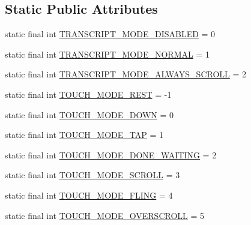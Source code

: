 \subsection*{Static Public Attributes}
\begin{DoxyCompactItemize}
\item 
static final int \hyperlink{classit_1_1sephiroth_1_1android_1_1library_1_1widget_1_1_abs_h_list_view_ae9e9ddb1a1226af35cdcc99a268fb58b}{T\+R\+A\+N\+S\+C\+R\+I\+P\+T\+\_\+\+M\+O\+D\+E\+\_\+\+D\+I\+S\+A\+B\+L\+ED} = 0
\item 
static final int \hyperlink{classit_1_1sephiroth_1_1android_1_1library_1_1widget_1_1_abs_h_list_view_a25b0476067d7722fd323bd283c96cdca}{T\+R\+A\+N\+S\+C\+R\+I\+P\+T\+\_\+\+M\+O\+D\+E\+\_\+\+N\+O\+R\+M\+AL} = 1
\item 
static final int \hyperlink{classit_1_1sephiroth_1_1android_1_1library_1_1widget_1_1_abs_h_list_view_a9cd6c736e279c525b81fa03f783d047c}{T\+R\+A\+N\+S\+C\+R\+I\+P\+T\+\_\+\+M\+O\+D\+E\+\_\+\+A\+L\+W\+A\+Y\+S\+\_\+\+S\+C\+R\+O\+LL} = 2
\item 
static final int \hyperlink{classit_1_1sephiroth_1_1android_1_1library_1_1widget_1_1_abs_h_list_view_a9e07e6f0ddde44e23ad0b53ecc476071}{T\+O\+U\+C\+H\+\_\+\+M\+O\+D\+E\+\_\+\+R\+E\+ST} = -\/1
\item 
static final int \hyperlink{classit_1_1sephiroth_1_1android_1_1library_1_1widget_1_1_abs_h_list_view_a9494dde00800a2a5492b25b8f9c33516}{T\+O\+U\+C\+H\+\_\+\+M\+O\+D\+E\+\_\+\+D\+O\+WN} = 0
\item 
static final int \hyperlink{classit_1_1sephiroth_1_1android_1_1library_1_1widget_1_1_abs_h_list_view_a57188f6ec53deb190fff6f6d4686a7b4}{T\+O\+U\+C\+H\+\_\+\+M\+O\+D\+E\+\_\+\+T\+AP} = 1
\item 
static final int \hyperlink{classit_1_1sephiroth_1_1android_1_1library_1_1widget_1_1_abs_h_list_view_a55796b925c6be6e21a88d2ead2a73ddf}{T\+O\+U\+C\+H\+\_\+\+M\+O\+D\+E\+\_\+\+D\+O\+N\+E\+\_\+\+W\+A\+I\+T\+I\+NG} = 2
\item 
static final int \hyperlink{classit_1_1sephiroth_1_1android_1_1library_1_1widget_1_1_abs_h_list_view_a633be6e393af7252d7a2078bcf0e991f}{T\+O\+U\+C\+H\+\_\+\+M\+O\+D\+E\+\_\+\+S\+C\+R\+O\+LL} = 3
\item 
static final int \hyperlink{classit_1_1sephiroth_1_1android_1_1library_1_1widget_1_1_abs_h_list_view_a8d1c262dc8301b9d1d2e3d7881eb2f5e}{T\+O\+U\+C\+H\+\_\+\+M\+O\+D\+E\+\_\+\+F\+L\+I\+NG} = 4
\item 
static final int \hyperlink{classit_1_1sephiroth_1_1android_1_1library_1_1widget_1_1_abs_h_list_view_aedd3c444f1f23ab1aa41415118841ff4}{T\+O\+U\+C\+H\+\_\+\+M\+O\+D\+E\+\_\+\+O\+V\+E\+R\+S\+C\+R\+O\+LL} = 5

\end{DoxyCompactItemize}
